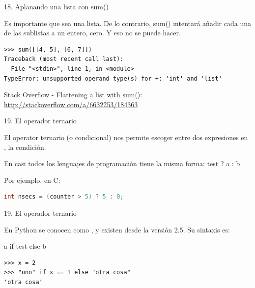 \documentclass[14pt]{beamer}
\begin{document}
\begin{frame}[fragile]{18. Aplanando una lista con sum()}
  \begin{alertblock}{}
    \centering
    Es importante que  sea una lista. De lo contrario,
    sum() intentará añadir cada una de las sublistas a un entero, cero.
    Y eso no se puede hacer.
  \end{alertblock}

  \scriptsize
  \begin{exampleblock}{}
    \begin{lstlisting}
>>> sum([[4, 5], [6, 7]])
Traceback (most recent call last):
  File "<stdin>", line 1, in <module>
TypeError: unsupported operand type(s) for +: 'int' and 'list'
    \end{lstlisting}
  \end{exampleblock}

  \small
  \begin{block}
    {\centering Stack Overflow - Flattening a list with sum():}
    \centering \url{http://stackoverflow.com/a/6632253/184363 }
  \end{block}
\end{frame}

\begin{frame}[fragile]{19. El operador ternario}
  \begin{center}
    El operator ternario (o condicional) nos permite escoger entre dos
    expresiones en , la condición.
  \end{center}

  \begin{block}
    {\small
      En casi todos los lenguajes de programación tiene la misma forma:}
    \centering \LARGE test ? a : b
  \end{block}

  \begin{exampleblock}{Por ejemplo, en C:}
    \begin{lstlisting}[language=C]
int nsecs = (counter > 5) ? 5 : 0;
    \end{lstlisting}
  \end{exampleblock}
\end{frame}

\begin{frame}[fragile]{19. El operador ternario}
  \begin{center}
    En Python se conocen como , y
    existen desde la versión 2.5. Su sintaxis es:
  \end{center}

  \begin{block}{}
    \centering \LARGE a if test else b
  \end{block}

  \begin{exampleblock}{}
    \begin{lstlisting}
>>> x = 2
>>> "uno" if x == 1 else "otra cosa"
'otra cosa'
    \end{lstlisting}
  \end{exampleblock}
\end{frame}
\end{document}
